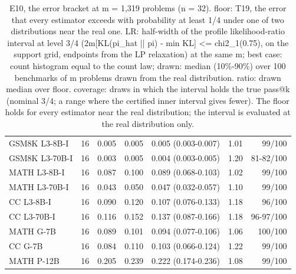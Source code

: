 \begin{table}[t]
\begin{tabular}{lrrrrrr}
GSM8K L3-8B-I & 16 & 0.005 & 0.005 & 0.005 (0.003-0.007) & 1.01 & 99/100 \\
GSM8K L3-70B-I & 16 & 0.003 & 0.005 & 0.004 (0.003-0.005) & 1.20 & 81-82/100 \\
MATH L3-8B-I & 16 & 0.087 & 0.100 & 0.089 (0.068-0.103) & 1.02 & 99/100 \\
MATH L3-70B-I & 16 & 0.043 & 0.050 & 0.047 (0.032-0.057) & 1.10 & 99/100 \\
CC L3-8B-I & 16 & 0.090 & 0.120 & 0.107 (0.076-0.133) & 1.18 & 96/100 \\
CC L3-70B-I & 16 & 0.116 & 0.152 & 0.137 (0.087-0.166) & 1.18 & 96-97/100 \\
MATH G-7B & 16 & 0.089 & 0.101 & 0.094 (0.077-0.106) & 1.06 & 100/100 \\
CC G-7B & 16 & 0.084 & 0.110 & 0.103 (0.066-0.124) & 1.22 & 99/100 \\
MATH P-12B & 16 & 0.205 & 0.239 & 0.222 (0.174-0.236) & 1.08 & 99/100 \\
\bottomrule
\end{tabular}
\caption{E10, the error bracket at m = 1,319 problems (n = 32). floor: T19, the error that every estimator exceeds with probability at least 1/4 under one of two distributions near the real one. LR: half-width of the profile likelihood-ratio interval at level 3/4 (2m[KL(pi\_hat || pi) - min KL] <= chi2\_1(0.75), on the support grid, endpoints from the LP relaxation) at the same m; best case: count histogram equal to the count law; drawn: median (10\%-90\%) over 100 benchmarks of m problems drawn from the real distribution. ratio: drawn median over floor. coverage: draws in which the interval holds the true pass@k (nominal 3/4; a range where the certified inner interval gives fewer). The floor holds for every estimator near the real distribution; the interval is evaluated at the real distribution only.}
\label{tab:T22_error_bracket_realistic_m}
\end{table}
